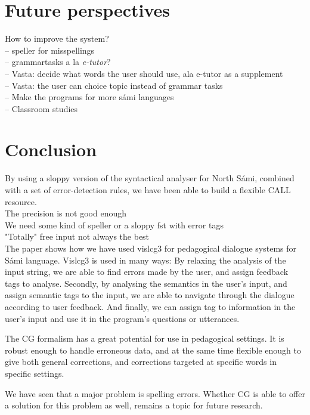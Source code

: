 \documentclass[11pt]{article}
\begin{document}
 

\section{Future perspectives}
How to improve the system? \\
-- speller for misspellings  \\
-- grammartasks a la \textit{e-tutor}? \\
-- Vasta: decide what words the user should use, ala e-tutor as a supplement \\
-- Vasta: the user can choice topic instead of grammar tasks \\
-- Make the programs for more sámi languages \\
-- Classroom studies \\

\section{Conclusion}

By using a sloppy version of the syntactical analyser for North Sámi, combined with a set of error-detection rules, we have been able to build a flexible CALL resource. \\ 
The precision is not good enough  \\
We need some kind of speller or a sloppy fst with error tags \\
"Totally" free input not always the best \\




The paper shows how we have used vislcg3 for pedagogical dialogue systems for Sámi language. Vislcg3 is used in many ways: By relaxing the analysis of the input string, we are able to find errors made by the user, and assign feedback tags to analyse. Secondly, by analysing the semantics in the user's input, and assign semantic tags to the input, we are able to navigate through the dialogue according to user feedback. And finally, we can assign tag to information in the user's input and use it in the program's questions or utterances.  

The CG formalism has a great potential for use in pedagogical settings.
It is robust enough to handle erroneous data, and at the same time flexible enough to give both general corrections, and corrections targeted at specific words in specific settings.

We have seen that a major problem is spelling errors. Whether CG is able to offer a solution for this problem as well, remains a topic for future research.
\end{document}
